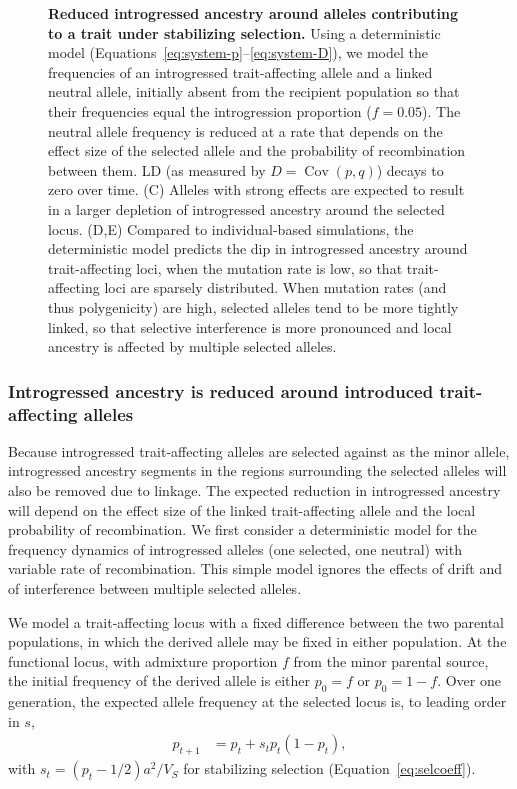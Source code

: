 \documentclass[10pt,letterpaper]{article}
\DeclareMathOperator{\Cov}{Cov}
\begin{document}
\begin{figure}[ht!]
    \centering
    \caption{
        \textbf{Reduced introgressed ancestry around alleles contributing to a
        trait under stabilizing selection.} Using a deterministic model
        (Equations~\ref{eq:system-p}--\ref{eq:system-D}), we model the
        frequencies of an introgressed trait-affecting allele and a linked
        neutral allele, initially absent from the recipient population so that
        their frequencies equal the introgression proportion ($f=0.05$). The
        neutral allele frequency is reduced at a rate that depends on the
        effect size of the selected allele and the probability of recombination
        between them. LD (as measured by $D=\Cov(p,q)$) decays to zero over
        time. (C) Alleles with strong effects are expected to result in a
        larger depletion of introgressed ancestry around the selected locus.
        (D,E) Compared to individual-based simulations, the deterministic model
        predicts the dip in introgressed ancestry around trait-affecting loci,
        when the mutation rate is low, so that trait-affecting loci are
        sparsely distributed. When mutation rates (and thus polygenicity) are
        high, selected alleles tend to be more tightly linked, so that
        selective interference is more pronounced and local ancestry is
        affected by multiple selected alleles.
    }
    \label{fig:linkage}
\end{figure}

\subsubsection*{Introgressed ancestry is reduced around introduced
trait-affecting alleles}

Because introgressed trait-affecting alleles are selected against as the minor
allele, introgressed ancestry segments in the regions surrounding the selected
alleles will also be removed due to linkage. The expected reduction in
introgressed ancestry will depend on the effect size of the linked
trait-affecting allele and the local probability of recombination. We first
consider a deterministic model for the frequency dynamics of introgressed
alleles (one selected, one neutral) with variable rate of recombination. This
simple model ignores the effects of drift and of interference between multiple
selected alleles.

We model a trait-affecting locus with a fixed difference between the two
parental populations, in which the derived allele may be fixed in either
population. At the functional locus, with admixture proportion $f$ from the
minor parental source, the initial frequency of the derived allele is either
$p_0=f$ or $p_0=1-f$. Over one generation, the expected allele frequency at the
selected locus is, to leading order in $s$,
\begin{align}\label{eq:system-p}
    p_{t+1} & = p_t + s_tp_t(1-p_t),
\end{align}
with \(s_t=(p_t-1/2)a^2/V_S\) for stabilizing selection
(Equation~\ref{eq:selcoeff}).
\end{document}
